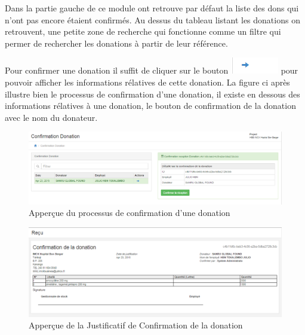 \documentclass[12pt,a4paper]{report}
\begin{document}
Dans la partie gauche de ce module ont retrouve par défaut la liste des dons qui n'ont pas encore étaient confirmés. Au dessus du tableau listant les donations on retrouvent, une petite zone de recherche qui fonctionne comme un filtre qui permer de rechercher les donations à partir de leur référence.

Pour confirmer une donation il suffit de cliquer sur le bouton \includegraphics[scale=0.7]{pic/BlueArrow.png} pour pouvoir afficher les informations rélatives de cette donation. La figure ci après illustre bien le processus de confirmation d'une donation, il existe en dessous des informations rélatives à une donation, le bouton de confirmation  de la donation avec le nom du donateur.

\begin{figure}[h]
\begin{center}
\includegraphics[width=12cm]{pic/ConfirDonation.png}
\end{center}
\caption{Apperçue du processus de confirmation d'une donation}
\label{Apperçue du processus de confirmation d'une donation}
\end{figure} 

\begin{figure}[h]
\begin{center}
\includegraphics[width=12cm]{pic/PreuveConfDonation.png}
\end{center}
\caption{Apperçue de la Justificatif de Confirmation de la donation}
\label{Apperçue de la Justificatif de Confirmation de la donation}
\end{figure} 
\end{document}
